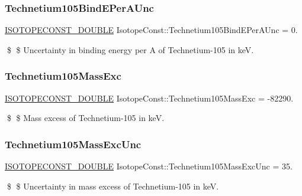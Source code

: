 \subsubsection{\texorpdfstring{Technetium105\+Bind\+E\+Per\+A\+Unc}{Technetium105BindEPerAUnc}}
{\footnotesize\ttfamily \mbox{\hyperlink{group___isotope_const-_macros_ga8f45a7272ce02c0b4c65c44636ed719a}{I\+S\+O\+T\+O\+P\+E\+C\+O\+N\+S\+T\+\_\+\+D\+O\+U\+B\+LE}} Isotope\+Const\+::\+Technetium105\+Bind\+E\+Per\+A\+Unc = 0.}

\$ \$ Uncertainty in binding energy per A of Technetium-\/105 in keV. \mbox{\label{group___isotope_const-_technetium-_tc105_gafc679e8260075e01074359f72a2928f3}} 
\subsubsection{\texorpdfstring{Technetium105\+Mass\+Exc}{Technetium105MassExc}}
{\footnotesize\ttfamily \mbox{\hyperlink{group___isotope_const-_macros_ga8f45a7272ce02c0b4c65c44636ed719a}{I\+S\+O\+T\+O\+P\+E\+C\+O\+N\+S\+T\+\_\+\+D\+O\+U\+B\+LE}} Isotope\+Const\+::\+Technetium105\+Mass\+Exc = -\/82290.}

\$ \$ Mass excess of Technetium-\/105 in keV. \mbox{\label{group___isotope_const-_technetium-_tc105_gabb2fef0cdd027414e1edcabd57b6ab06}} 
\subsubsection{\texorpdfstring{Technetium105\+Mass\+Exc\+Unc}{Technetium105MassExcUnc}}
{\footnotesize\ttfamily \mbox{\hyperlink{group___isotope_const-_macros_ga8f45a7272ce02c0b4c65c44636ed719a}{I\+S\+O\+T\+O\+P\+E\+C\+O\+N\+S\+T\+\_\+\+D\+O\+U\+B\+LE}} Isotope\+Const\+::\+Technetium105\+Mass\+Exc\+Unc = 35.}

\$ \$ Uncertainty in mass excess of Technetium-\/105 in keV. \mbox{\label{group___isotope_const-_technetium-_tc105_ga035b940d5d77e71c71b0b8271b7b161a}} 
